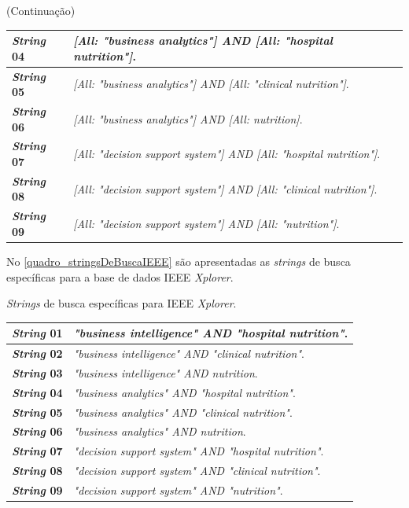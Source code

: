 \begin{quadro}[htb]
(Continuação)
\begin{tabular}{|p{2cm}|p{11cm}|}
	\hline
	\textbf{\textit{String} 04}	& \textit{[All: "business analytics"] AND [All: "hospital nutrition"]}.	\\ \hline
	\textbf{\textit{String} 05}	& \textit{[All: "business analytics"] AND [All: "clinical nutrition"]}. \\ \hline
	\textbf{\textit{String} 06}	& \textit{[All: "business analytics"] AND [All: nutrition]}. \\ \hline
	\textbf{\textit{String} 07}	& \textit{[All: "decision support system"] AND [All: "hospital nutrition"]}.\\ \hline
    \textbf{\textit{String} 08}	& \textit{[All: "decision support system"] AND [All: "clinical nutrition"]}.\\ \hline
    \textbf{\textit{String} 09}	& \textit{[All: "decision support system"] AND [All: "nutrition"]}.\\ \hline
\end{tabular}
\end{quadro}

No \autoref{quadro_stringsDeBuscaIEEE} são apresentadas as \textit{strings} de busca específicas para a base de dados IEEE \textit{Xplorer}.   

\begin{quadro}[htb]
\caption{\label{quadro_stringsDeBuscaIEEE}\textit{Strings} de busca específicas para IEEE \textit{Xplorer}.}
\label{}
\begin{tabular}{|p{2cm}|p{11cm}|}
	\hline
	\textbf{\textit{String} 01}	& \textit{"business intelligence" AND "hospital nutrition"}.  \\ \hline
	\textbf{\textit{String} 02}	& \textit{"business intelligence" AND "clinical nutrition"}.   \\ \hline
	\textbf{\textit{String} 03}	& \textit{"business intelligence" AND nutrition}.   \\ \hline
	\textbf{\textit{String} 04}	& \textit{"business analytics" AND "hospital nutrition"}.	\\ \hline
	\textbf{\textit{String} 05}	& \textit{"business analytics" AND "clinical nutrition"}. \\ \hline
	\textbf{\textit{String} 06}	& \textit{"business analytics" AND nutrition}. \\ \hline
	\textbf{\textit{String} 07}	& \textit{"decision support system" AND "hospital nutrition"}.\\ \hline
    \textbf{\textit{String} 08}	& \textit{"decision support system" AND "clinical nutrition"}.\\ \hline
    \textbf{\textit{String} 09}	& \textit{"decision support system" AND "nutrition"}.\\ \hline
\end{tabular}
\end{quadro}

